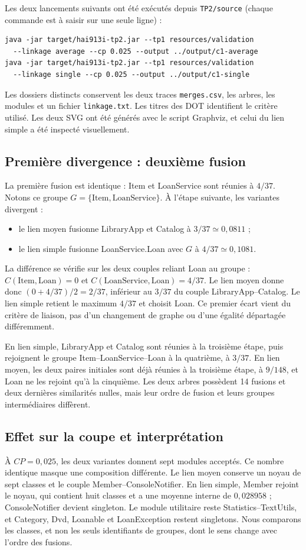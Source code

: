 \documentclass[11pt,a4paper]{article}
\begin{document}
Les deux lancements suivants ont été exécutés depuis \texttt{TP2/source}
(chaque commande est à saisir sur une seule ligne) :
\begin{verbatim}
java -jar target/hai913i-tp2.jar --tp1 resources/validation
  --linkage average --cp 0.025 --output ../output/c1-average
java -jar target/hai913i-tp2.jar --tp1 resources/validation
  --linkage single --cp 0.025 --output ../output/c1-single
\end{verbatim}
Les dossiers distincts conservent les deux traces \texttt{merges.csv}, les arbres,
les modules et un fichier \texttt{linkage.txt}. Les titres des DOT identifient
le critère utilisé. Les deux SVG ont été générés avec le script Graphviz,
et celui du lien simple a été inspecté visuellement.

\subsection{Première divergence : deuxième fusion}
La première fusion est identique : Item et LoanService sont réunies à $4/37$.
Notons ce groupe $G=\{\mathrm{Item},\mathrm{LoanService}\}$.
À l'étape suivante, les variantes divergent :
\begin{itemize}
\item le lien moyen fusionne LibraryApp et Catalog à $3/37\simeq0{,}0811$ ;
\item le lien simple fusionne LoanService.Loan avec $G$ à
$4/37\simeq0{,}1081$.
\end{itemize}
La différence se vérifie sur les deux couples reliant Loan au groupe :
$C(\mathrm{Item},\mathrm{Loan})=0$ et
$C(\mathrm{LoanService},\mathrm{Loan})=4/37$.
Le lien moyen donne donc $(0+4/37)/2=2/37$, inférieur au $3/37$ du couple
LibraryApp--Catalog. Le lien simple retient le maximum $4/37$ et choisit Loan.
Ce premier écart vient du critère de liaison, pas d'un changement de graphe
ou d'une égalité départagée différemment.

En lien simple, LibraryApp et Catalog sont réunies à la troisième étape,
puis rejoignent le groupe Item--LoanService--Loan à la quatrième, à $3/37$.
En lien moyen, les deux paires initiales sont déjà réunies à la troisième
étape, à $9/148$, et Loan ne les rejoint qu'à la cinquième.
Les deux arbres possèdent 14 fusions et deux dernières similarités nulles,
mais leur ordre de fusion et leurs groupes intermédiaires diffèrent.

\subsection{Effet sur la coupe et interprétation}
À $CP=0{,}025$, les deux variantes donnent sept modules acceptés. Ce nombre
identique masque une composition différente. Le lien moyen conserve un noyau
de sept classes et le couple Member--ConsoleNotifier. En lien simple, Member
rejoint le noyau, qui contient huit classes et a une moyenne interne de
$0{,}028958$ ; ConsoleNotifier devient singleton. Le module utilitaire reste
Statistics--TextUtils, et Category, Dvd, Loanable et LoanException restent
singletons. Nous comparons les classes, et non les seuls identifiants de
groupes, dont le sens change avec l'ordre des fusions.
\end{document}
